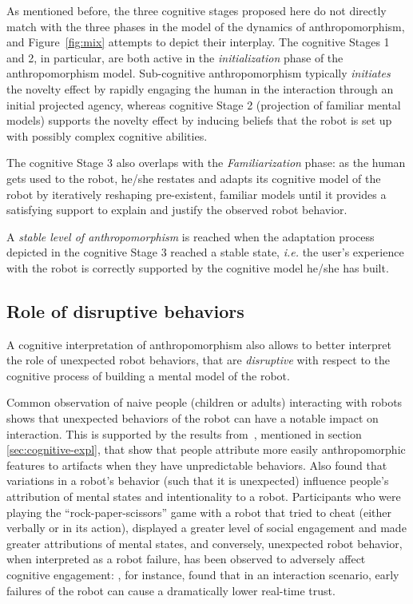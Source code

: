 \documentclass{frontiersSCNS} %
\newcommand{\ie}{\textit{i.e.}\xspace}
\begin{document}
As mentioned before, the three cognitive stages proposed here do not directly
match with the three phases in the model of the dynamics of anthropomorphism,
and Figure~\ref{fig:mix} attempts to depict their interplay.
The cognitive Stages 1 and 2, in particular, are both active in the
\emph{initialization} phase of the anthropomorphism model. Sub-cognitive
anthropomorphism typically \emph{initiates} the novelty effect by rapidly
engaging the human in the interaction through an initial projected agency,
whereas cognitive Stage 2 (projection of familiar mental models) supports the
novelty effect by inducing beliefs that the robot is set up with possibly
complex cognitive abilities.

The cognitive Stage 3 also overlaps with the \emph{Familiarization} phase: as
the human gets used to the robot, he/she restates and adapts its
cognitive model of the robot by iteratively reshaping pre-existent, familiar
models until it provides a satisfying support to explain and justify the
observed robot behavior.

A \emph{stable level of anthropomorphism} is reached when the adaptation process
depicted in the cognitive Stage 3 reached a stable state, \ie the user's
experience with the robot is correctly supported by the cognitive model he/she
has built.


\subsection{Role of disruptive behaviors}
\label{sec:disruptive}

A cognitive interpretation of anthropomorphism also allows to better interpret
the role of unexpected robot behaviors, that are \emph{disruptive} with respect
to the cognitive process of building a mental model of the robot.

Common observation of naive people (children or adults) interacting with robots
shows that unexpected behaviors of the robot can have a notable impact on
interaction. This is supported by the results from~\citet{Waytz2010}, mentioned
in section \ref{sec:cognitive-expl}, that show that people attribute more easily
anthropomorphic features to artifacts when they have unpredictable behaviors.
Also \cite{short_no_2010} found that variations in a robot's behavior (such that
it is unexpected) influence people's attribution of mental states and
intentionality to a robot. Participants who were playing the
``rock-paper-scissors'' game with a robot that tried to cheat (either verbally
or in its action), displayed a greater level of social engagement and made
greater attributions of mental states, and conversely, unexpected robot
behavior, when interpreted as a robot failure, has been observed to adversely
affect cognitive engagement: \cite{desai_impact_2013}, for instance, found that
in an interaction scenario, early failures of the robot can cause a dramatically
lower real-time trust.
\end{document}
